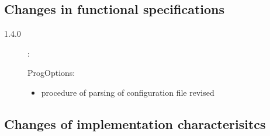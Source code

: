 \documentclass[10pt]{article}
\newenvironment{component}[1]{\par#1:\begin{itemize}}{\end{itemize}}
\begin{document}
\subsection{Changes in functional specifications}

\begin{description}

\item [1.4.0]:
      \begin{component}{ProgOptions}
      \item procedure of parsing of configuration file revised
      \end{component}

\end{description}

\subsection{Changes of implementation characterisitcs}
\end{document}
